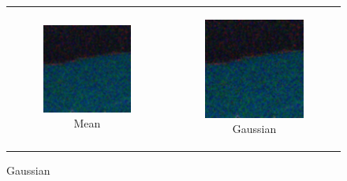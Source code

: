 \begin{figure}
\begin{tabular}{cc}
    \begin{subfigure}{0.3\textwidth}
      \includegraphics[width=\linewidth]{inc/research/simple/denoised_mean.png}
      \caption{Mean}
    \end{subfigure} &
    \begin{subfigure}{0.3\textwidth}
      \includegraphics[width=\linewidth]{inc/research/simple/denoised_gaussian.png}
      \caption{Gaussian}
    \end{subfigure} \\
    

\end{tabular}
\end{figure}
